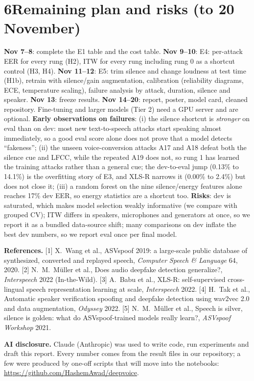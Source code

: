 \documentclass[10pt]{article}
\begin{document}
\section*{6\quad Remaining plan and risks (to 20 November)}
\textbf{Nov 7--8}: complete the E1 table and the cost table.
\textbf{Nov 9--10}: E4: per-attack EER for every rung (H2), ITW for every rung including rung 0 as a
shortcut control (H3, H4). \textbf{Nov 11--12}: E5: trim silence and change loudness at test time
(H1b), retrain with silence/gain augmentation, calibration (reliability diagrams, ECE, temperature
scaling), failure analysis by attack, duration, silence and speaker. \textbf{Nov 13}: freeze results.
\textbf{Nov 14--20}: report, poster, model card, cleaned repository. Fine-tuning and larger models
(Tier 2) need a GPU server and are optional.
\textbf{Early observations on failures}: (i) the silence shortcut is \emph{stronger} on eval than on
dev: most new text-to-speech attacks start speaking almost immediately, so a good eval score alone does
not prove that a model detects ``fakeness''; (ii) the unseen voice-conversion attacks A17 and A18 defeat
both the silence cue and LFCC, while the repeated A19 does not, so rung 1 has learned the training
attacks rather than a general cue; the dev-to-eval jump (0.13\% to 14.1\%) is the overfitting story of
E3, and XLS-R narrows it (0.00\% to 2.4\%) but does not close it; (iii) a random forest on the nine
silence/energy features alone reaches 17\% dev EER, so energy statistics are a shortcut too.
\textbf{Risks}: dev is saturated, which makes model selection weakly informative (we compare with
grouped CV); ITW differs in speakers, microphones and generators at once, so we report it as a bundled
data-source shift; many comparisons on dev inflate the best dev numbers, so we report eval once per
final model.

\vfill
{\footnotesize\textbf{References.}
[1] X.\ Wang et al., ASVspoof 2019: a large-scale public database of synthesized, converted and
replayed speech, \emph{Computer Speech \& Language} 64, 2020.
[2] N.\ M.\ M\"uller et al., Does audio deepfake detection generalize?, \emph{Interspeech} 2022
(In-the-Wild).
[3] A.\ Babu et al., XLS-R: self-supervised cross-lingual speech representation learning at scale,
\emph{Interspeech} 2022.
[4] H.\ Tak et al., Automatic speaker verification spoofing and deepfake detection using wav2vec 2.0
and data augmentation, \emph{Odyssey} 2022.
[5] N.\ M.\ M\"uller et al., Speech is silver, silence is golden: what do ASVspoof-trained models
really learn?, \emph{ASVspoof Workshop} 2021.\par
\textbf{AI disclosure.} Claude (Anthropic) was used to write code, run experiments and draft this
report. Every number comes from the result files in our repository; a few were produced by one-off scripts that will move into the notebooks:
\url{https://github.com/HashemAwad/deepvoice}.}
\end{document}
